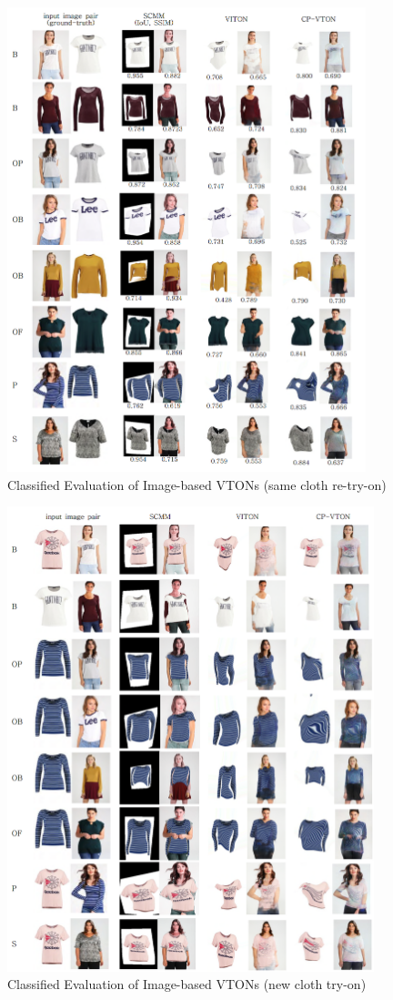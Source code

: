 \documentclass[runningheads]{llncs}
\begin{document}
\begin{figure}
\centering
\includegraphics[height=13.5cm, scale=1]{figures/2dvton_same.png}   
\caption{Classified Evaluation of Image-based VTONs (same cloth re-try-on)}
\label{fig:2dvton_same}
\end{figure}

\begin{figure}
\centering
\includegraphics[height=13.5cm, scale=1]{figures/2dvton_diff.png}  %
\caption{Classified Evaluation of Image-based VTONs (new cloth try-on)}
\label{fig:2dvton_diff}
\end{figure}
\end{document}
